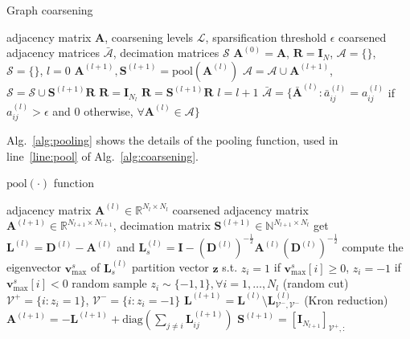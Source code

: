 \documentclass[journal]{IEEEtran}
\def\z{{\mathbf z}}
\def\v{{\mathbf v}}
\def\A{{\mathbf A}}
\def\L{{\mathbf L}}
\def\D{{\mathbf D}}
\def\S{{\mathbf S}}
\def\I{{\mathbf I}}
\begin{document}
\begin{algorithm}\footnotesize
\caption{Graph coarsening}
\label{alg:coarsening}
\begin{algorithmic}[1]
\REQUIRE adjacency matrix $\A$, coarsening levels $\mathcal{L}$, sparsification threshold $\epsilon$
\ENSURE coarsened adjacency matrices $\mathcal{\bar A}$, decimation matrices $\mathcal{S}$
\STATE $\A^{(0)} = \A$, $\mathbf{R} = \I_N$, $\mathcal{A} = \{\}$, $\mathcal{S} = \{\}$, $l=0$
\STATE $\A^{(l+1)}, \S^{(l+1)} = \text{pool}(\A^{(l)})$ \label{line:pool}
\STATE $\mathcal{A} = \mathcal{A} \cup \A^{(l+1)}$, $\mathcal{S} = \mathcal{S} \cup \S^{(l+1)}\mathbf{R}$
\STATE $\mathbf{R} = \I_{N_l}$
\ELSE
\STATE $\mathbf{R} = \S^{(l+1)}\mathbf{R}$
\ENDIF
\STATE $l = l+1$
\ENDWHILE
\STATE $\mathcal{\bar A} = \{\bar \A^{(l)}: \bar a^{(l)}_{ij} = a^{(l)}_{ij}$ if $a^{(l)}_{ij} > \epsilon$ and $0$ otherwise, $\forall \A^{(l)} \in \mathcal{A} \}$ 
\end{algorithmic}
\end{algorithm}


Alg.~\ref{alg:pooling} shows the details of the pooling function, used in line~\ref{line:pool} of Alg.~\ref{alg:coarsening}.

\begin{algorithm}\footnotesize
\caption{$\text{pool}(\cdot)$ function}
\label{alg:pooling}
\begin{algorithmic}[1]
\REQUIRE adjacency matrix $\A^{(l)} \in \mathbb{R}^{N_l \times N_l}$
\ENSURE coarsened adjacency matrix $\A^{(l+1)} \in \mathbb{R}^{N_{l+1} \times N_{l+1}}$, decimation matrix $\S^{(l+1)} \in \mathbb{N}^{N_{l+1} \times N_l}$
\STATE get $\L^{(l)} = \D^{(l)} - \A^{(l)}$  and $\L_s^{(l)} = \I - (\D^{(l)})^{-\frac{1}{2}} \A^{(l)} (\D^{(l)})^{-\frac{1}{2}}$ 
\STATE compute the eigenvector $\v^s_\text{max}$ of $\L_s^{(l)}$
\STATE partition vector $\z$ s.t. $z_i = 1$ if $\v^s_\text{max}[i] \geq 0$,  $z_i = -1$ if $\v^s_\text{max}[i] < 0$
\IF{$\gamma(\z) < 0.5$}
\STATE random sample $z_i \sim \{-1,1\}, \forall i=1, \dots, N_l$ (random cut)
\ENDIF
\STATE $\mathcal{V}^{+} = \{i: z_i=1\}$, $\mathcal{V}^{-} = \{i: z_i=-1\}$
\STATE $\L^{(l+1)} = \L^{(l)} \setminus \L^{(l)}_{\mathcal{V}^{-}, \mathcal{V}^{-}}$ (Kron reduction)
\STATE $\A^{(l+1)} = -\L^{(l+1)} + \text{diag}(\sum_{j\neq i} \L^{(l+1)}_{ij})$
\STATE $\S^{(l+1)} = [\I_{N_{l+1}}]_{\mathcal{V}^{+}, :}$
\end{algorithmic}
\end{algorithm}
\end{document}
